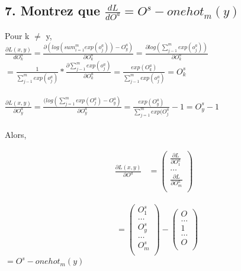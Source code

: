 \documentclass[12pt]{article}
\begin{document}
 \subsection{7. Montrez que $\frac{dL}{dO^{a}} = O^{s} - onehot_{m}(y)$}
Pour k $\neq$ y,\\

$\frac{\partial L(x,y)}{dO_{k}^a} = \frac{\partial (log(sum_{i=1}^{m}exp(o_j^a)) - O_y^a)}{\partial O_k^a} = \frac{\partial log(\sum_{j-1}^m exp(o_j^a))}{\partial O_k^a} $\\
$= \frac{1}{\sum_{j-1}^m exp(o_j^a)}*\frac{\partial \sum_{j-1}^m exp(o_j^a)}{\partial O_k^a} = \frac{exp(O_k^a)}{\sum_{j-1}^m exp(o_j^a)} = O_k^s$\\
\\
$\frac{\partial L(x,y)}{\partial O_y^a} = \frac{(log(\sum_{j=1}^{m}exp(O_{j}^{a})-O_y^a)}{\partial O_y^a} = \frac{exp(O_y^a)}{\sum_{j=1}^{m}exp(O_{j}^{a}} -1 =O_y^s -1 $\\
\\

Alors,

\begin{align*} 
  \frac{\partial L(x,y)}{\partial O^a}
    &=
    \left(
      \begin{array}{r}
       \frac{\partial L}{\partial O_1^a} \\
          \dots \\
          \frac{\partial L}{\partial O_m^a} \\
      \end{array}
     \right)
\end{align*}

\begin{align*} 
    &=
    \left(
      \begin{array}{r}
       O_1^s \\
          \dots \\
	O_y^s\\
	\dots\\
          O_m^s\\
      \end{array}
     \right) - 
	\left(
      \begin{array}{r}
       O \\
          \dots \\
	1\\
	\dots\\
          O\\
      \end{array}
     \right)
\end{align*}
$ = O^s - onehot_m(y)$
\end{document}

